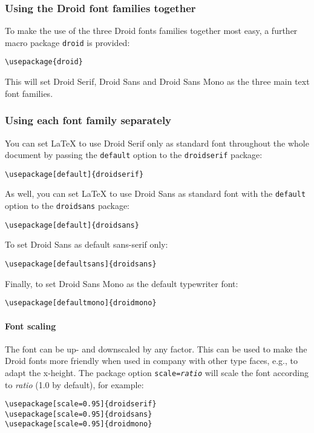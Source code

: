 \documentclass{article}
\newcommand{\code}{\texttt}
\newcommand{\package}{\texttt}
\newcommand{\parameter}[1]{\textnormal{\textit{#1}}}
\begin{document}
\subsubsection{Using the Droid font families together}

To make the use of the three Droid fonts families together most easy, a further
macro package \package{droid} is provided:
\begin{verbatim}
\usepackage{droid}
\end{verbatim}
This will set Droid Serif, Droid Sans and Droid Sans Mono as the three main text
font families.

\subsubsection{Using each font family separately}

You can set \LaTeX{} to use Droid Serif only as standard font throughout the
whole document by passing the \code{default} option to the \package{droidserif}
package:
\begin{verbatim}
\usepackage[default]{droidserif}
\end{verbatim}

As well, you can set \LaTeX{} to use Droid Sans as standard font with the
\code{default} option to the \package{droidsans} package:
\begin{verbatim}
\usepackage[default]{droidsans}
\end{verbatim}
To set Droid Sans as default sans-serif only:
\begin{verbatim}
\usepackage[defaultsans]{droidsans}
\end{verbatim}

Finally, to set Droid Sans Mono as the default typewriter font:
\begin{verbatim}
\usepackage[defaultmono]{droidmono}
\end{verbatim}

\paragraph{Font scaling}

The font can be up- and downscaled by any factor. This can be used to make the
Droid fonts more friendly when used in company with other type faces, e.g., to
adapt the x-height. The package option \code{scale=\parameter{ratio}} will scale
the font according to \parameter{ratio} (1.0 by default), for example:
\begin{verbatim}
\usepackage[scale=0.95]{droidserif}
\usepackage[scale=0.95]{droidsans}
\usepackage[scale=0.95]{droidmono}
\end{verbatim}
\end{document}
